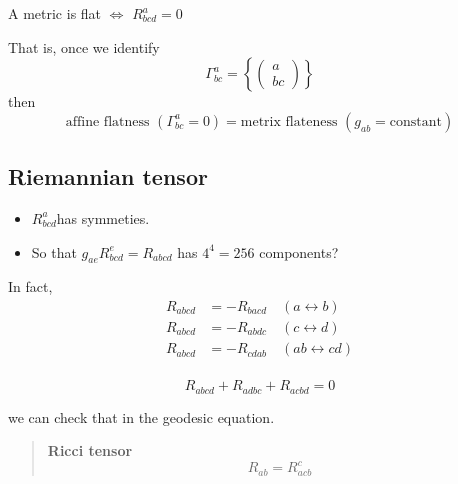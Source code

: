 
A metric is flat $\Leftrightarrow$ $R^{a}_{bcd} = 0$













That is, once we identify
\begin{equation}
\Gamma^{a}_{bc} = \left\{\begin{pmatrix}a\\bc\end{pmatrix}\right\}
\end{equation}
 then
\begin{equation}
\text{affine flatness $(\Gamma^{a}_{bc}=0)$} = \text{metrix flateness $(g_{ab}=\text{constant})$}
\end{equation}


\subsection{Riemannian tensor} %


\begin{itemize}
	\item $R^{a}_{bcd}$​ has symmeties.
	\item So that $g_{ae}R^{e}_{bcd} = R_{abcd}$ has $4^{4}=256$ components?

\end{itemize}
In fact,
\begin{equation}
\begin{aligned}
R_{abcd} &= - R_{bacd}\quad (a\leftrightarrow b)\\
R_{abcd} &= - R_{abdc}\quad (c\leftrightarrow d)\\
R_{abcd} &= - R_{cdab}\quad (ab\leftrightarrow cd)\\
\end{aligned}
\end{equation}




\begin{equation}
R_{abcd} + R_{adbc} + R_{acbd} = 0
\end{equation}

we can check that in the geodesic equation.

\begin{quote}
	\textbf{Ricci tensor}
\begin{equation}
R_{ab} = R^{c}_{acb}
\end{equation}


\end{quote}

